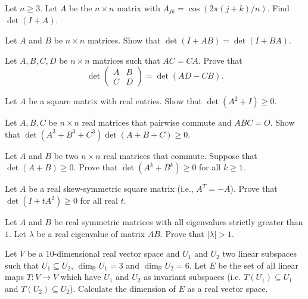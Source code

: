 \documentclass[12pt]{article}
\begin{document}
\begin{problem}
Let $n\ge 3$. Let $A$ be the $n\times n$ matrix with $A_{jk}=\cos(2\pi(j+k)/n)$. Find $\det(I+A)$.
\end{problem}

\begin{problem}
Let $A$ and $B$ be $n\times n$ matrices. Show that $\det(I+AB) = \det(I+BA)$.
\end{problem}

\begin{problem}
Let $A,B,C,D$ be $n\times n$ matrices such that $AC=CA$. Prove that
\[
\det\begin{pmatrix}A & B\\ C & D\end{pmatrix} = \det(AD-CB).
\]
\end{problem}

\begin{problem}
Let $A$ be a square matrix with real entries. Show that $\det(A^2+I)\ge 0$.
\end{problem}

\begin{problem}
Let $A,B,C$ be $n\times n$ real matrices that pairwise commute and $ABC=O$. Show that $\det(A^3+B^3+C^3)\det(A+B+C) \ge 0$.
\end{problem}

\begin{problem}
Let $A$ and $B$ be two $n\times n$ real matrices that commute. Suppose that $\det(A+B)\ge 0$. Prove that $\det(A^k+B^k) \ge 0$ for all $k\ge 1$.
\end{problem}

\begin{problem}
Let $A$ be a real skew-symmetric square matrix (i.e., $A^T=-A$). Prove that $\det(I+tA^2) \ge 0$ for all real $t$.
\end{problem}

\begin{problem}
Let $A$ and $B$ be real symmetric matrices with all eigenvalues strictly greater than $1$. Let $\lambda$ be a real eigenvalue of matrix $AB$. Prove that $|\lambda|>1$.
\end{problem}

\begin{problem}
Let $V$ be a $10$-dimensional real vector space and $U_1$ and $U_2$ two linear subspaces such that $U_1\subseteq U_2$, $\dim_{\mathbb{R}} U_1=3$ and $\dim_{\mathbb{R}} U_2=6$. Let $E$ be the set of all linear maps $T:V\to V$ which have $U_1$ and $U_2$ as invariant subspaces (i.e. $T(U_1)\subseteq U_1$ and $T(U_2)\subseteq U_2$). Calculate the dimension of $E$ as a real vector space.
\end{problem}
\end{document}

